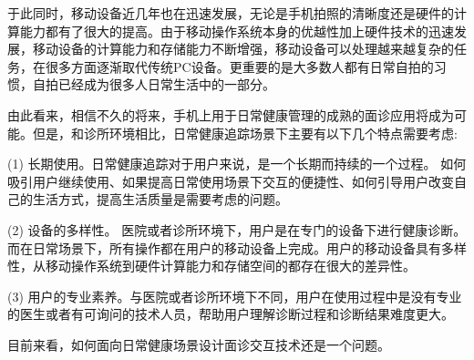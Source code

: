 于此同时，移动设备近几年也在迅速发展，无论是手机拍照的清晰度还是硬件的计算能力都有了很大的提高。由于移动操作系统本身的优越性加上硬件技术的迅速发展，移动设备的计算能力和存储能力不断增强，移动设备可以处理越来越复杂的任务，在很多方面逐渐取代传统PC设备。更重要的是大多数人都有日常自拍的习惯，自拍已经成为很多人日常生活中的一部分。



由此看来，相信不久的将来，手机上用于日常健康管理的成熟的面诊应用将成为可能。但是，和诊所环境相比，日常健康追踪场景下主要有以下几个特点需要考虑: 

(1) 长期使用。日常健康追踪对于用户来说，是一个长期而持续的一个过程。 如何吸引用户继续使用、如果提高日常使用场景下交互的便捷性、如何引导用户改变自己的生活方式，提高生活质量是需要考虑的问题。

(2) 设备的多样性。 医院或者诊所环境下，用户是在专门的设备下进行健康诊断。而在日常场景下，所有操作都在用户的移动设备上完成。用户的移动设备具有多样性，从移动操作系统到硬件计算能力和存储空间的都存在很大的差异性。

(3) 用户的专业素养。与医院或者诊所环境下不同，用户在使用过程中是没有专业的医生或者有可询问的技术人员，帮助用户理解诊断过程和诊断结果难度更大。

目前来看，如何面向日常健康场景设计面诊交互技术还是一个问题。






